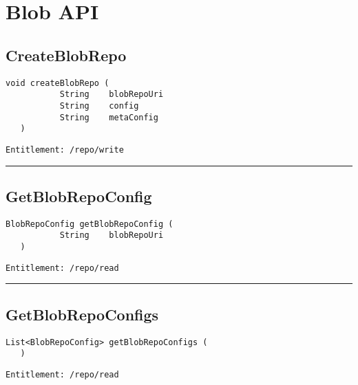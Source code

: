 \chapter{Blob API}

\section{CreateBlobRepo}
\label{Api:CreateBlobRepo}
\begin{lstlisting}[style=nonumbers]
   void createBlobRepo (
           String    blobRepoUri
           String    config
           String    metaConfig
   )
\end{lstlisting}
\begin{Verbatim}[formatcom=\color{Maroon}]
  Entitlement: /repo/write
\end{Verbatim}



\rule{12cm}{2pt}
\section{GetBlobRepoConfig}
\label{Api:GetBlobRepoConfig}
\begin{lstlisting}[style=nonumbers]
   BlobRepoConfig getBlobRepoConfig (
           String    blobRepoUri
   )
\end{lstlisting}
\begin{Verbatim}[formatcom=\color{Maroon}]
  Entitlement: /repo/read
\end{Verbatim}



\rule{12cm}{2pt}
\section{GetBlobRepoConfigs}
\label{Api:GetBlobRepoConfigs}
\begin{lstlisting}[style=nonumbers]
   List<BlobRepoConfig> getBlobRepoConfigs (
   )
\end{lstlisting}
\begin{Verbatim}[formatcom=\color{Maroon}]
  Entitlement: /repo/read
\end{Verbatim}




